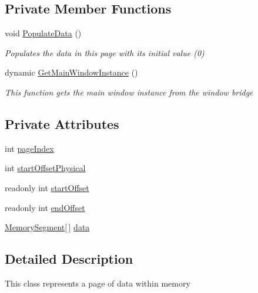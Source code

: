 \subsection*{Private Member Functions}
\begin{DoxyCompactItemize}
\item 
void \hyperlink{class_c_p_u___o_s___simulator_1_1_memory_1_1_memory_page_a4006da1460cb3bf17076dfbade9d0038}{Populate\+Data} ()
\begin{DoxyCompactList}\small\item\em Populates the data in this page with its initial value (0) \end{DoxyCompactList}\item 
dynamic \hyperlink{class_c_p_u___o_s___simulator_1_1_memory_1_1_memory_page_a84a305171941df5c3ae72b34ccec5485}{Get\+Main\+Window\+Instance} ()
\begin{DoxyCompactList}\small\item\em This function gets the main window instance from the window bridge \end{DoxyCompactList}\end{DoxyCompactItemize}
\subsection*{Private Attributes}
\begin{DoxyCompactItemize}
\item 
int \hyperlink{class_c_p_u___o_s___simulator_1_1_memory_1_1_memory_page_acf60a7bdefab6120fe080854b5f0b38b}{page\+Index}
\item 
int \hyperlink{class_c_p_u___o_s___simulator_1_1_memory_1_1_memory_page_a3cecfb0fe2f91def3db5711180442d44}{start\+Offset\+Physical}
\item 
readonly int \hyperlink{class_c_p_u___o_s___simulator_1_1_memory_1_1_memory_page_a6fe2e28385db19a1968a41efe3df3f38}{start\+Offset}
\item 
readonly int \hyperlink{class_c_p_u___o_s___simulator_1_1_memory_1_1_memory_page_ae2f8f419909326ce5449d37af9ff7c89}{end\+Offset}
\item 
\hyperlink{class_c_p_u___o_s___simulator_1_1_memory_1_1_memory_segment}{Memory\+Segment}\mbox{[}$\,$\mbox{]} \hyperlink{class_c_p_u___o_s___simulator_1_1_memory_1_1_memory_page_af9ab25101e7920de2344e0fa5ddfaa27}{data}
\end{DoxyCompactItemize}


\subsection{Detailed Description}
This class represents a page of data within memory 



